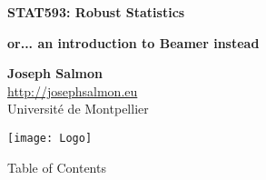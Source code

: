 \documentclass[unknownkeysallowed]{beamer}
\begin{document}



\begin{frame}
\bigskip
\bigskip
\begin{center}{
\LARGE\color{marron}
\textbf{STAT593: Robust Statistics}
\textbf{ }\\
\vspace{0.5cm}
}

\color{marron}
\textbf{or... an introduction to Beamer instead}
\end{center}

\vspace{0.5cm}

\begin{center}
\textbf{Joseph Salmon} \\
\vspace{0.1cm}
\url{http://josephsalmon.eu}\\
\vspace{0.5cm}
Université de Montpellier \\
\end{center}

\centering
\texttt{[image: Logo]}

\end{frame}






\begin{frame}{Table of Contents}
\tableofcontents[hideallsubsections]
\end{frame}



\end{document}
